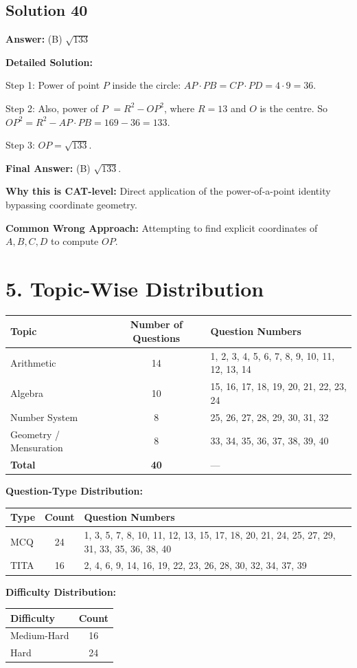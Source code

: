 \documentclass[11pt]{article}
\begin{document}
\subsection*{Solution 40}
\textbf{Answer:} (B) $\sqrt{133}$

\textbf{Detailed Solution:}

Step 1: Power of point $P$ inside the circle: $AP \cdot PB = CP \cdot PD = 4 \cdot 9 = 36$.

Step 2: Also, power of $P$ $= R^2 - OP^2$, where $R = 13$ and $O$ is the centre. So $OP^2 = R^2 - AP \cdot PB = 169 - 36 = 133$.

Step 3: $OP = \sqrt{133}$.

\textbf{Final Answer:} (B) $\sqrt{133}$.

\textbf{Why this is CAT-level:} Direct application of the power-of-a-point identity bypassing coordinate geometry.

\textbf{Common Wrong Approach:} Attempting to find explicit coordinates of $A, B, C, D$ to compute $OP$.

\newpage
\section*{5. Topic-Wise Distribution}

\begin{longtable}{|l|c|l|}
\hline
\textbf{Topic} & \textbf{Number of Questions} & \textbf{Question Numbers} \\
\hline\hline
Arithmetic & 14 & 1, 2, 3, 4, 5, 6, 7, 8, 9, 10, 11, 12, 13, 14 \\ \hline
Algebra & 10 & 15, 16, 17, 18, 19, 20, 21, 22, 23, 24 \\ \hline
Number System & 8 & 25, 26, 27, 28, 29, 30, 31, 32 \\ \hline
Geometry / Mensuration & 8 & 33, 34, 35, 36, 37, 38, 39, 40 \\ \hline
\textbf{Total} & \textbf{40} & --- \\ \hline
\end{longtable}

\vspace{0.4em}

\textbf{Question-Type Distribution:}

\begin{longtable}{|l|c|l|}
\hline
\textbf{Type} & \textbf{Count} & \textbf{Question Numbers} \\
\hline\hline
MCQ & 24 & 1, 3, 5, 7, 8, 10, 11, 12, 13, 15, 17, 18, 20, 21, 24, 25, 27, 29, 31, 33, 35, 36, 38, 40 \\ \hline
TITA & 16 & 2, 4, 6, 9, 14, 16, 19, 22, 23, 26, 28, 30, 32, 34, 37, 39 \\ \hline
\end{longtable}

\textbf{Difficulty Distribution:}

\begin{longtable}{|l|c|}
\hline
\textbf{Difficulty} & \textbf{Count} \\
\hline\hline
Medium-Hard & 16 \\ \hline
Hard & 24 \\ \hline
\end{longtable}
\end{document}
